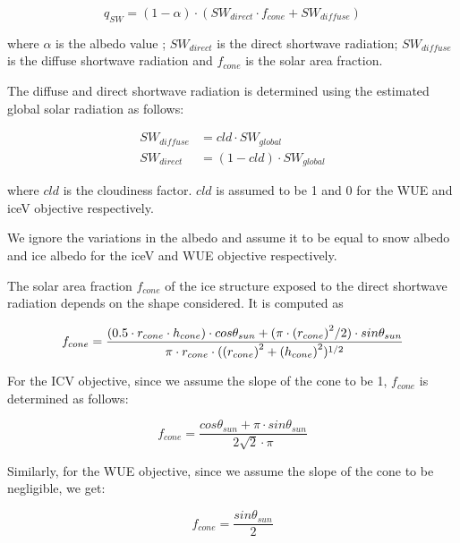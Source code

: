 \documentclass[tc, manuscript]{copernicus}
\begin{document}
\begin{equation} 
q_{SW} = (1- \alpha) \cdot ( SW_{direct} \cdot f_{cone} + SW_{diffuse})
\label{eqn:SW} 
\end{equation}

where $\alpha$ is the albedo value ; $SW_{direct}$ is the direct shortwave radiation; $SW_{diffuse}$ is the
diffuse shortwave radiation and $f_{cone}$ is the solar area fraction.

The diffuse and direct shortwave radiation is determined using the estimated global solar radiation as follows:

\begin{equation}
\begin{split}
  SW_{diffuse} &= cld \cdot SW_{global}\\
  SW_{direct} &= (1-cld) \cdot SW_{global}
\end{split}
\end{equation}

where $cld$ is the cloudiness factor. $cld$ is assumed to be 1 and 0 for the WUE and iceV objective
respectively.

We ignore the variations in the albedo and assume it to be equal to snow albedo and ice albedo for the iceV and
WUE objective respectively.

The solar area fraction $f_{cone}$ of the ice structure exposed to the direct shortwave radiation depends on the
shape considered. It is computed as

\begin{equation}
		f_{cone} =\frac{(0.5 \cdot r_{cone} \cdot h_{cone}) \cdot cos \theta_{sun} +(\pi \cdot
			{(r_{cone})}^2/2) \cdot sin \theta_{sun} }{\pi \cdot r_{cone} \cdot ({(r_{cone})}^2+{(h_{cone})}^2)^{1/2}}\\
\end{equation}

For the ICV objective, since we assume the slope of the cone to be 1, $f_{cone}$ is determined as follows:

\begin{equation}
		f_{cone} =\frac{ cos \theta_{sun} + \pi \cdot sin \theta_{sun} }{2\sqrt{2} \cdot \pi }
\end{equation}

Similarly, for the WUE objective, since we assume the slope of the cone to be negligible, we get:

\begin{equation}
		f_{cone} =\frac{ sin \theta_{sun} }{2 }
\end{equation}
\end{document}
